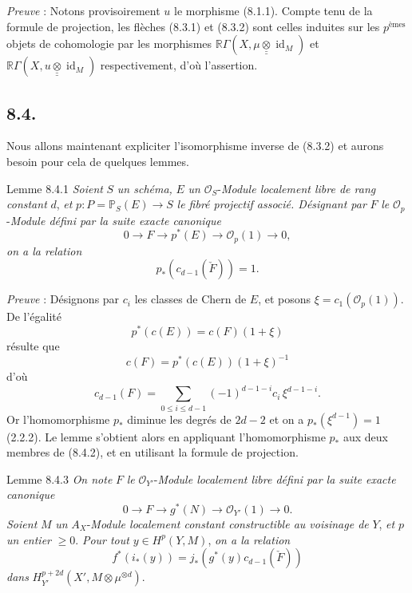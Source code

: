 \emph{Preuve} : Notons provisoirement $u$ le morphisme (8.1.1). Compte tenu de la formule de projection, les flèches (8.3.1) et (8.3.2) sont celles induites sur les $p^{\text{èmes}}$ objets de cohomologie par les morphismes $\mathbb{R}\Gamma(X,\mu\mathbin{\underline{\underline{\otimes}}}\operatorname{id}_M)$ et $\mathbb{R}\Gamma(X,u\mathbin{\underline{\underline{\otimes}}}\operatorname{id}_M)$ respectivement, d'où l'assertion.

\subsection*{8.4.}

Nous allons maintenant expliciter l'isomorphisme inverse de (8.3.2) et aurons besoin pour cela de quelques lemmes.

\begin{statement}{Lemme 8.4.1}
\emph{Soient} $S$ \emph{un schéma,} $E$ \emph{un} $\mathcal{O}_S$-\emph{Module localement libre de rang constant} $d$, \emph{et} $p:P=\mathbb{P}_S(E)\to S$ \emph{le fibré projectif associé. Désignant par} $F$ \emph{le} $\mathcal{O}_p$-\emph{Module défini par la suite exacte canonique}
\[
0\to F\to p^*(E)\to\mathcal{O}_p(1)\to0,
\]
\emph{on a la relation}
\[
p_*(c_{d-1}(\check F))=1.
\]
\end{statement}

\emph{Preuve} : Désignons par $c_i$ les classes de Chern de $E$, et posons $\xi=c_1(\mathcal{O}_p(1))$. De l'égalité
\[
p^*(c(E))=c(F)(1+\xi)
\]
résulte que
\[
c(F)=p^*(c(E))(1+\xi)^{-1}
\]
d'où
\[
c_{d-1}(F)=\sum_{0\le i\le d-1}(-1)^{d-1-i}c_i\,\xi^{d-1-i}.
\tag{8.4.2}
\]
Or l'homomorphisme $p_*$ diminue les degrés de $2d-2$ et on a $p_*(\xi^{d-1})=1$ (2.2.2). Le lemme s'obtient alors en appliquant l'homomorphisme $p_*$ aux deux membres de (8.4.2), et en utilisant la formule de projection.

\begin{statement}{Lemme 8.4.3}
\emph{On note} $F$ \emph{le} $\mathcal{O}_{Y'}$-\emph{Module localement libre défini par la suite exacte canonique}
\[
0\to F\to g^*(N)\to\mathcal{O}_{Y'}(1)\to0.
\]
\emph{Soient} $M$ \emph{un} $A_X$-\emph{Module localement constant constructible au voisinage de} $Y$, \emph{et} $p$ \emph{un entier} $\ge0$. \emph{Pour tout} $y\in H^p(Y,M)$, \emph{on a la relation}
\[
f^*(i_*(y))=j_*(g^*(y)c_{d-1}(\check F))
\]
\emph{dans} $H_{Y'}^{p+2d}(X',M\otimes\mu^{\otimes d})$.
\end{statement}

